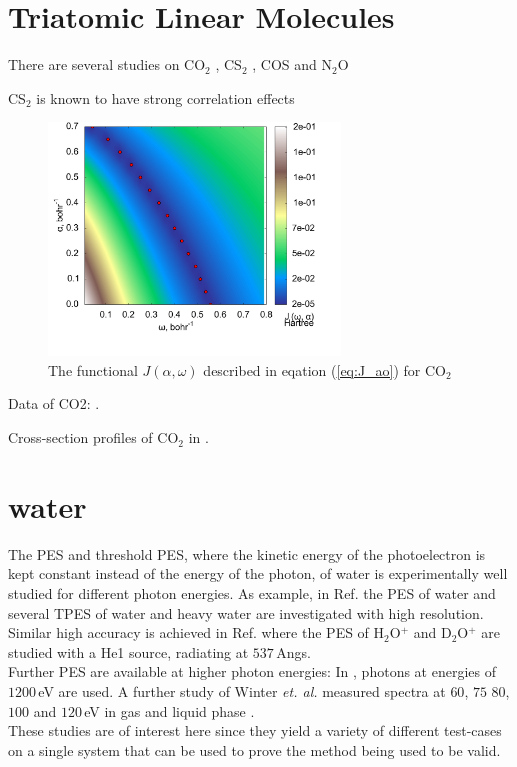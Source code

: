 \section{Triatomic Linear Molecules}
There are several studies on CO$_2$ \cite{CO2, CO2_highres, HighResLinear, DiffLinear}, CS$_2$ \cite{DiffLinear,HighResLinear}, COS \cite{DiffLinear,HighResLinear} and N$_2$O \cite{DiffLinear}

CS$_2$ is known to have strong correlation effects \cite{2phcederbaum}
\begin{figure}
\includegraphics[width=0.69\textwidth]{Figures/CO2_J0_2D_terrain}
\caption{The functional $J(\alpha,\omega)$ described in eqation (\ref{eq:J_ao}) for CO$_2$}
\label{fig:CO2-otrsh}
\end{figure}

Data of CO2: \cite{DiffLinear}.

Cross-section profiles of CO$_2$ in \cite{stieltje}.

\section{water}
The PES and threshold PES, where the kinetic energy of the photoelectron is kept constant instead of the energy of the photon, of water is experimentally well studied 
for different photon energies.
As example, in Ref. \cite{waterTPE} the PES of water and several TPES of water and heavy water are investigated with high resolution.\\
Similar high accuracy is achieved in Ref. \cite{waterHePES} where the PES of H$_2$O$^+$ and D$_2$O$^+$ are studied with a He1 source, radiating at $537\,$Angs.\\
Further PES are available at higher photon energies:
In \cite{water1200}, photons at energies of $1200\,$eV are used.
A further study of Winter \textit{et. al.} measured spectra at $60$, $75$ $80$, $100$ and $120\,$eV in gas and liquid phase \cite{winterWater}.\\
These studies are of interest here since they yield a variety of different test-cases on a single system that can be used to prove the method being used to be valid.
